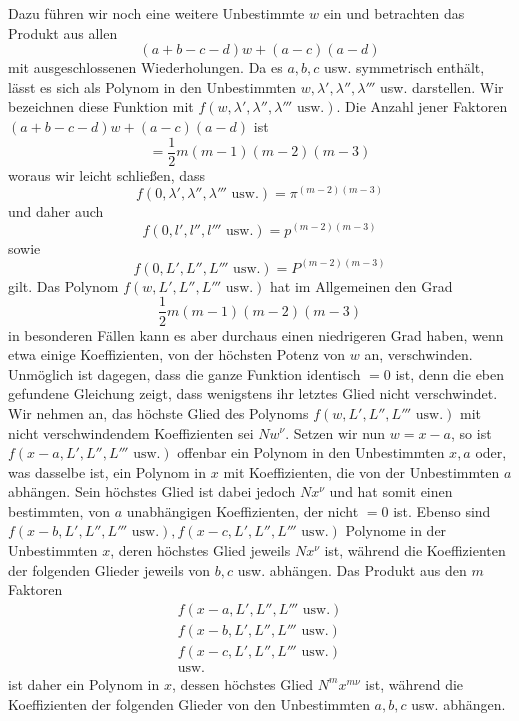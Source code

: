 Dazu führen wir noch eine weitere Unbestimmte $w$ ein und betrachten das Produkt aus allen
\[
(a+b-c-d)w+(a-c)(a-d)
\]
mit ausgeschlossenen Wiederholungen. Da es $a,b,c$ usw. symmetrisch enthält, lässt es sich als Polynom in den Unbestimmten $w,\lambda',\lambda'',\lambda'''$ usw. darstellen. Wir bezeichnen diese Funktion mit $f(w,\lambda',\lambda'',\lambda'''\text{ usw.})$. Die Anzahl jener Faktoren $(a+b-c-d)w+(a-c)(a-d)$ ist
\[
=\frac12m(m-1)(m-2)(m-3)
\]
woraus wir leicht schließen, dass
\[
f(0,\lambda',\lambda'',\lambda'''\text{ usw.})=\pi^{(m-2)(m-3)}
\]
und daher auch
\[
f(0,l',l'',l'''\text{ usw.})=p^{(m-2)(m-3)}
\]
sowie
\[
f(0,L',L'',L'''\text{ usw.})=P^{(m-2)(m-3)}
\]
gilt. Das Polynom $f(w,\allowbreak L',\allowbreak L'',\allowbreak L'''\text{ usw.})$ hat im Allgemeinen den Grad
\[
\frac12m(m-1)(m-2)(m-3)
\]
in besonderen Fällen kann es aber durchaus einen niedrigeren Grad haben, wenn etwa einige Koeffizienten, von der höchsten Potenz von $w$ an, verschwinden. Unmöglich ist dagegen, dass die ganze Funktion identisch $=0$ ist, denn
die eben gefundene Gleichung zeigt, dass wenigstens ihr letztes Glied nicht verschwindet. Wir nehmen an, das höchste Glied des Polynoms $f(w,\allowbreak L',\allowbreak L'',\allowbreak L'''\text{ usw.})$ mit nicht verschwindendem Koeffizienten sei $Nw^\nu$. Setzen wir nun $w=x-a$, so ist $f(x-a,L',L'',L'''\text{ usw.})$ offenbar ein Polynom in den Unbestimmten $x,a$ oder, was dasselbe ist, ein Polynom in $x$ mit Koeffizienten, die von der Unbestimmten $a$ abhängen. Sein höchstes Glied ist dabei jedoch $Nx^\nu$ und hat somit einen bestimmten, von $a$ unabhängigen Koeffizienten, der nicht $=0$ ist. Ebenso sind $f(x-b,L',L'',L'''\text{ usw.}),f(x-c,L',L'',L'''\text{ usw.})$ Polynome in der Unbestimmten $x$, deren höchstes Glied jeweils $Nx^\nu$ ist, während die Koeffizienten der folgenden Glieder jeweils von $b,c$ usw. abhängen. Das Produkt aus den $m$ Faktoren
\[
\begin{gathered}
f(x-a,L',L'',L'''\text{ usw.})\\
f(x-b,L',L'',L'''\text{ usw.})\\
f(x-c,L',L'',L'''\text{ usw.})\\
\text{usw.}
\end{gathered}
\]
ist daher ein Polynom in $x$, dessen höchstes Glied $N^mx^{m\nu}$ ist, während die Koeffizienten der folgenden Glieder von den Unbestimmten $a,b,c$ usw. abhängen.

